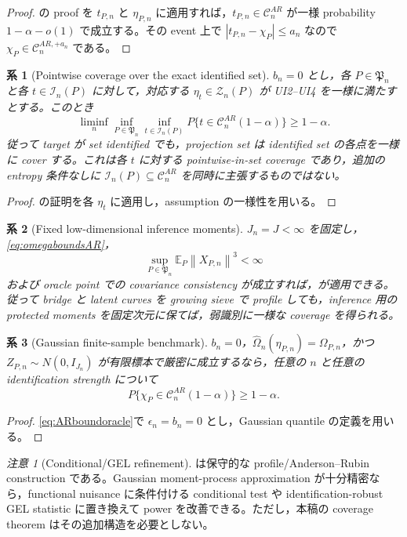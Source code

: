 \documentclass[11pt,a4paper]{ltjsarticle}
\newtheorem{corollary}{系}[section]
\theoremstyle{remark}
\newtheorem{remark}{注意}[section]
\newcommand{\E}{\mathbb E}
\newcommand{\wh}{\widehat}
\newcommand{\norm}[1]{\left\lVert#1\right\rVert}
\newcommand{\cC}{\mathcal C}
\newcommand{\cI}{\mathcal I}
\newcommand{\cZ}{\mathcal Z}
\begin{document}
\begin{proof}
の proof を $t_{P,n}$ と $\eta_{P,n}$ に適用すれば，$t_{P,n}\in\cC_n^{AR}$ が一様 probability $1-\alpha-o(1)$ で成立する。その event 上で
$|t_{P,n}-\chi_P|\le a_n$ なので $\chi_P\in\cC_n^{AR,+a_n}$ である。
\end{proof}

\begin{corollary}[Pointwise coverage over the exact identified set]\label{cor:exactidentifiedsetAR}
$b_n=0$ とし，各 $P\in\mathfrak P_n$ と各 $t\in\cI_n(P)$ に対して，対応する $\eta_t\in\cZ_n(P)$ が UI2--UI4 を一様に満たすとする。このとき
\[
\liminf_n\inf_{P\in\mathfrak P_n}\inf_{t\in\cI_n(P)}
P\{t\in\cC_n^{AR}(1-\alpha)\}
\ge1-\alpha.
\]
従って target が set identified でも，projection set は identified set の各点を一様に cover する。これは各 $t$ に対する pointwise-in-set coverage であり，追加の entropy 条件なしに $\cI_n(P)\subseteq\cC_n^{AR}$ を同時に主張するものではない。
\end{corollary}

\begin{proof}
の証明を各 $\eta_t$ に適用し，assumption の一様性を用いる。
\end{proof}

\begin{corollary}[Fixed low-dimensional inference moments]\label{cor:fixedJAR}
$J_n=J<\infty$ を固定し，\eqref{eq:omegaboundsAR}，
\[
\sup_{P\in\mathfrak P_n}\E_P\norm{X_{P,n}}^3<\infty
\]
および oracle point での covariance consistency が成立すれば，が適用できる。従って bridge と latent curves を growing sieve で profile しても，inference 用の protected moments を固定次元に保てば，弱識別に一様な coverage を得られる。
\end{corollary}

\begin{corollary}[Gaussian finite-sample benchmark]\label{cor:gaussianARexact}
$b_n=0$，$\wh\Omega_n(\eta_{P,n})=\Omega_{P,n}$，かつ $Z_{P,n}\sim N(0,I_{J_n})$ が有限標本で厳密に成立するなら，任意の $n$ と任意の identification strength について
\[
P\{\chi_P\in\cC_n^{AR}(1-\alpha)\}\ge1-\alpha.
\]
\end{corollary}

\begin{proof}
\eqref{eq:ARboundoracle}で $\epsilon_n=b_n=0$ とし，Gaussian quantile の定義を用いる。
\end{proof}

\begin{remark}[Conditional/GEL refinement]\label{rem:conditionalrefinement}
は保守的な profile/Anderson--Rubin construction である。Gaussian moment-process approximation が十分精密なら，functional nuisance に条件付ける conditional test \cite{AndrewsMikusheva2016} や identification-robust GEL statistic に置き換えて power を改善できる。ただし，本稿の coverage theorem はその追加構造を必要としない。
\end{remark}
\end{document}
